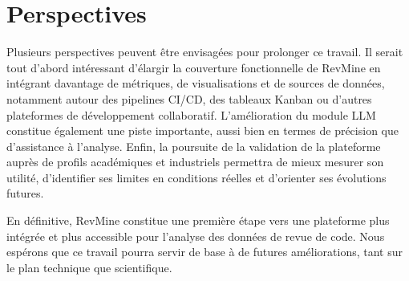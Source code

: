 \section*{Perspectives}

Plusieurs perspectives peuvent être envisagées pour prolonger ce travail. Il serait tout d’abord intéressant d’élargir la couverture fonctionnelle de RevMine en intégrant davantage de métriques, de visualisations et de sources de données, notamment autour des pipelines CI/CD, des tableaux Kanban ou d’autres plateformes de développement collaboratif. L’amélioration du module LLM constitue également une piste importante, aussi bien en termes de précision que d’assistance à l’analyse. Enfin, la poursuite de la validation de la plateforme auprès de profils académiques et industriels permettra de mieux mesurer son utilité, d’identifier ses limites en conditions réelles et d’orienter ses évolutions futures.

En définitive, RevMine constitue une première étape vers une plateforme plus intégrée et plus accessible pour l’analyse des données de revue de code. Nous espérons que ce travail pourra servir de base à de futures améliorations, tant sur le plan technique que scientifique.





